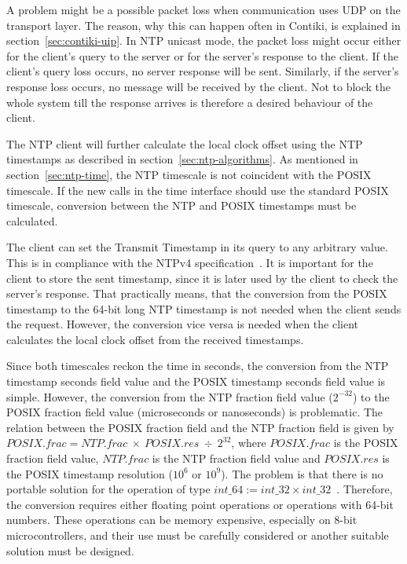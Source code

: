 A problem might be a possible packet loss when communication uses UDP on the transport layer.
The reason, why this can happen often in Contiki, is explained in section~\ref{sec:contiki-uip}.
In NTP unicast mode, the packet loss might occur either for the client's query to the server
or for the server's response to the client.
If the client's query loss occurs, no server response will be sent.
Similarly, if the server's response loss occurs, no message will be received by the client.
Not to block the whole system till the response arrives
is therefore a desired behaviour of the client.

The NTP client will further calculate the local clock offset using the NTP timestamps
as described in section~\ref{sec:ntp-algorithms}.
As mentioned in section~\ref{sec:ntp-time}, the NTP timescale is not
coincident with the POSIX timescale.
If the new calls in the time interface should use the standard POSIX timescale,
conversion between the NTP and POSIX timestamps must be calculated.

The client can set the Transmit Timestamp in its query to any arbitrary value.
This is in compliance with the NTPv4 specification~\cite{rfc5905}.
It is important for the client to store the sent timestamp,
since it is later used by the client to check the server's response.
That practically means, that the conversion from the POSIX timestamp to the 64-bit long NTP timestamp
is not needed when the client sends the request.
However, the conversion vice versa is needed when the client calculates
the local clock offset from the received timestamps.

Since both timescales reckon the time in seconds, the conversion from
the NTP timestamp seconds field value and the POSIX timestamp seconds field value is simple.
However, the conversion from the NTP fraction field value ($2^{-32}$)
to the POSIX fraction field value (microseconds or nanoseconds) is problematic.
The relation between the POSIX fraction field and the NTP fraction field
is given by $POSIX.frac = NTP.frac~\times~POSIX.res~\div~2^{32}$,
where $POSIX.frac$ is the POSIX fraction field value,
$NTP.frac$ is the NTP fraction field value and
$POSIX.res$ is the POSIX timestamp resolution ($10^6$ or $10^9$).
The problem is that there is no portable solution for the operation of type $int\_64 := int\_32 \times int\_32$~\cite{c99}.
Therefore, the conversion requires either floating point operations or operations with 64-bit numbers.
These operations can be memory expensive, especially on 8-bit microcontrollers,
and their use must be carefully considered or another suitable solution must be designed.
